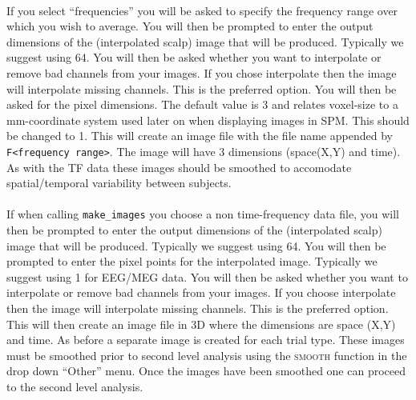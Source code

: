\\
If you select ``frequencies'' you will be asked to specify the frequency range over which you wish to average. You will then be prompted to enter the output dimensions of the (interpolated scalp) image that will be produced. Typically we suggest using 64.  You will then be asked whether you want to interpolate or remove bad channels from your images. If you chose interpolate then the image will interpolate missing channels. This is the preferred option. You will then be asked for the pixel dimensions. The default value is 3 and relates voxel-size to a mm-coordinate system used later on when displaying images in SPM. This should be changed to 1. This will create an image file with the file name appended by \texttt{F<frequency range>}. The image will have 3 dimensions (space(X,Y) and time). As with the TF data these images should be smoothed to accomodate spatial/temporal variability between subjects.
\\
\\
If when calling \texttt{make\_images} you choose a non time-frequency data file, you will then be prompted to enter the output dimensions of the (interpolated scalp)  image that will be produced. Typically we suggest using 64.  You will then be prompted to enter the pixel points for the interpolated image. Typically we suggest using 1 for EEG/MEG data. You will then be asked whether you want to interpolate or remove bad channels from your images. If you choose interpolate then the image will interpolate missing channels. This is the preferred option.  This will then create an image file in 3D where the dimensions are space (X,Y) and time. As before a separate image is created for each trial type. These images must be smoothed prior to second level analysis using the \textsc{smooth} function in the drop down ``Other'' menu. Once the images have been smoothed one can proceed to the second level analysis.






